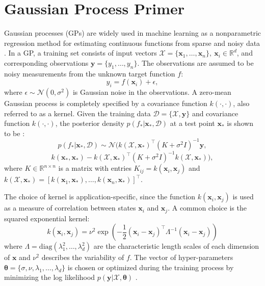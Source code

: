 \documentclass[letterpaper, 10 pt, conference]{ieeeconf}  %
\newcommand{\by}{\mathbf{y}}
\newcommand{\bx}{\mathbf{x}}
\newcommand{\mX}{\mathcal{X}}
\newcommand{\mD}{\mathcal{D}}
\newcommand{\mN}{\mathcal{N}}
\begin{document}
\section{Gaussian Process Primer}
 Gaussian processes (GPs) are widely used in machine learning as a nonparametric regression method for estimating continuous functions from sparse and noisy data \cite{rasmussen2006}.
In a GP, a training set consists of input vectors $\mX = \{\bx_1, \ldots, \bx_n\}, ~\bx_i \in \mathbb{R}^d$, and corresponding observations $\by = \{y_1, \ldots, y_n\}$.
The observations are assumed to be noisy measurements from the unknown target function $f$:
\begin{equation}
y_i = f(\bx_i) + \epsilon,
\end{equation}
where $\epsilon \sim \mN(0,\sigma^2)$ is Gaussian noise in the observations.
A zero-mean Gaussian process is completely specified by a covariance function $k(\cdot,\cdot)$, also referred to as a kernel.
Given the training data $\mD = \{\mX, \by\}$ and covariance function $k(\cdot,\cdot)$, the posterior density $p(f_*|\bx_*,\mD)$ at a test point $\bx_{*}$ is shown to be \cite{rasmussen2006}:
\begin{equation}
  p(f_*|\bx_*,\mD) 
  \sim 
  \mN\big(k(\mX,\bx_*)^{\intercal}(K + \sigma^2I)^{-1}\by,
\end{equation}
\[
  k(\bx_*,\bx_*)-k(\mX,\bx_*)^{\intercal}(K+\sigma^2I)^{-1}k(\mX,\bx_*)\big), \label{eq:GPposterior}
\]
where $K \in \mathbb{R}^{n \times n}$ is a matrix with entries $K_{ij} = k(\bx_i,\bx_j)$ and $k(\mX,\bx_*) = [k(\bx_1,\bx_*),\ldots,k(\bx_n,\bx_*)]^{\intercal}$. 

The choice of kernel is application-specific, since the function $k(\bx_i,\bx_j)$ is used as a measure of correlation between states $\bx_i$ and $\bx_j$.
A common choice is the squared exponential kernel:
\begin{equation}
k(\bx_i,\bx_j) 
=
\nu^2\exp(-\frac{1}{2}(\bx_i - \bx_j)^{\intercal}\Lambda^{-1}(\bx_i - \bx_j))
\end{equation}
where $\Lambda= \text{diag}(\lambda_1^2,\ldots,\lambda_d^2)$ are the characteristic length scales of each dimension of $\bx$ and $\nu^2$ describes the variability of $f$.
The vector of hyper-parameters $\boldsymbol{\theta} = \{\sigma,\nu,\lambda_1,\ldots,\lambda_d\}$ is chosen or optimized during the training process by minimizing the log likelihood $p(\by|\mX,\boldsymbol{\theta})$ \cite{rasmussen2006}.
\end{document}
